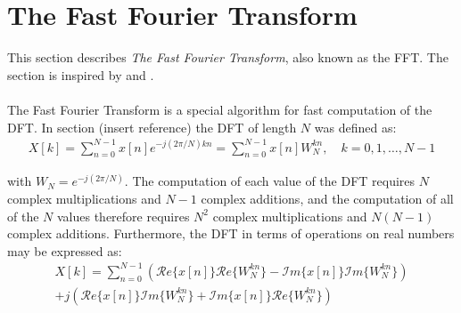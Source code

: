 \section{The Fast Fourier Transform} \label{sec:FFT}
This section describes \textit{The Fast Fourier Transform}, also known as the FFT. The section is inspired by \cite{pages 750, 755-763 DTSP} and \cite{page 303, FSP}.
\\ \\
The Fast Fourier Transform is a special algorithm for fast computation of the DFT. In section (insert reference) the DFT of length $N$ was defined as:
\begin{align*}
X[k] = \sum_{n=0}^{N-1} x[n] e^{-j(2\pi/N)kn} = \sum_{n=0}^{N-1} x[n] W_N^{kn}, \quad k = 0, 1, \dots, N-1
\end{align*}

with $W_N = e^{-j(2\pi/N)}$. The computation of each value of the DFT requires $N$ complex multiplications and $N-1$ complex additions, and the computation of all of the $N$ values therefore requires $N^2$ complex multiplications and $N(N-1)$ complex additions. Furthermore, the DFT in terms of operations on real numbers may be expressed as:
\begin{align*}
X[k] = \sum_{n=0}^{N-1} \left( \mathcal{R}e\{x[n]\} \mathcal{R}e\{W_N^{kn}\} - \mathcal{I}m\{x[n]\}\mathcal{I}m \{W_N^{kn}\} \right) \\ + j \left( \mathcal{R}e\{x[n]\}\mathcal{I}m \{W_N^{kn}\} + \mathcal{I}m \{x[n]\} \mathcal{R}e\{W_N^{kn}\}\right)
\end{align*}

